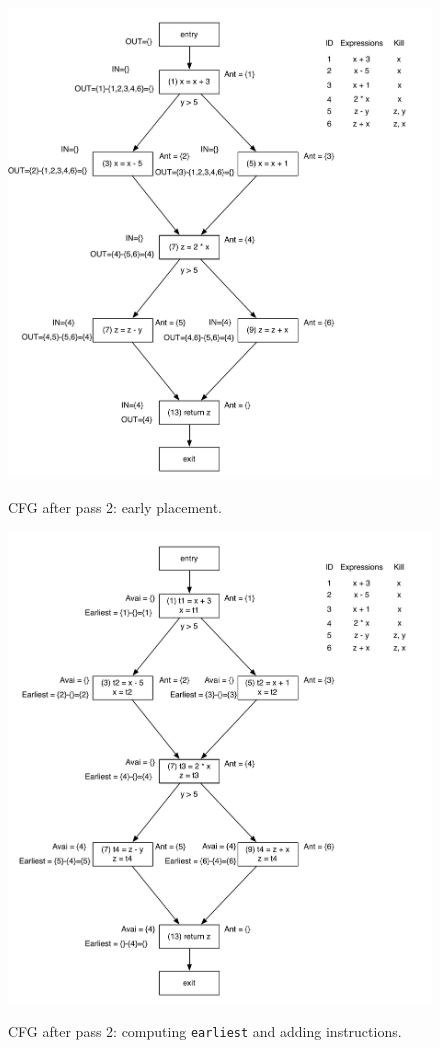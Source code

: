 \documentclass[12pt]{article}
\begin{document}
\begin{figure}[!htbp]
    \centering
    \caption{CFG after pass 2: early placement.}
    \includegraphics[scale=0.65]{cfg2.pdf}
    \label{fig:cfg2}
\end{figure}

\begin{figure}[!htbp]
    \centering
    \caption{CFG after pass 2: computing \texttt{earliest} and adding instructions.}
    \includegraphics[scale=0.65]{cfg2_1.pdf}
    \label{fig:cfg21}
\end{figure}
\end{document}
